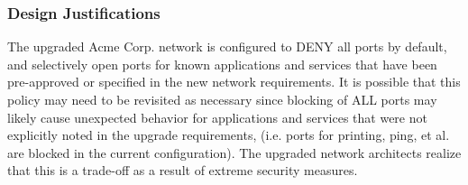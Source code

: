 \subsubsection{Design Justifications}
The upgraded Acme Corp. network is configured to DENY all ports by default, and
selectively open ports for known applications and services that have been
pre-approved or specified in the new network requirements. It is possible that
this policy may need to be revisited as necessary since blocking of ALL ports 
may likely cause unexpected behavior for applications and services that were 
not explicitly noted in the upgrade requirements, (i.e. ports for printing, 
ping, et al. are blocked in the current configuration). The upgraded network
architects realize that this is a trade-off as a result of extreme security 
measures.

